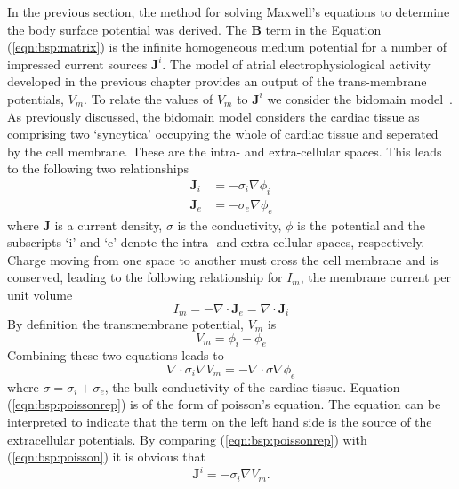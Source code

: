 In the previous section, the method for solving Maxwell's equations to determine
the body surface potential was derived.
The $\mathbf{B}$ term in the Equation (\ref{eqn:bsp:matrix}) is the infinite
homogeneous medium potential for a number of impressed current sources
$\mathbf{J}^i$.
The model of atrial electrophysiological activity developed in the previous
chapter provides an output of the trans-membrane potentials, $V_m$.
To relate the values of $V_m$ to $\mathbf{J}^i$ we consider the bidomain
model~\cite{Tung1978,Geselowitz1989}.
As previously discussed, the bidomain model considers the cardiac tissue as
comprising two `syncytica' occupying the whole of cardiac tissue and seperated
by the cell membrane.
These are the intra- and extra-cellular spaces.
This leads to the following two relationships
\begin{align}
\label{eqn:bsp:bidomaini}
\mathbf{J}_i & = -\sigma_i \nabla \phi_i \\
\label{eqn:bsp:bidomaine}
\mathbf{J}_e & = -\sigma_e \nabla \phi_e
\end{align}
where $\mathbf{J}$ is a current density, $\sigma$ is the conductivity, $\phi$
is the potential and the subscripts `i' and `e' denote the intra- and
extra-cellular spaces, respectively.
Charge moving from one space to another must cross the cell membrane and is
conserved, leading to the following relationship for $I_m$, the membrane current per unit
volume
\begin{equation}
\label{eqn:bsp:im}
I_m = -\nabla\cdot\mathbf{J}_e = \nabla\cdot\mathbf{J}_i
\end{equation}
By definition the transmembrane potential, $V_m$ is
\begin{equation}
\label{eqn:bsp:tmp}
V_m = \phi_i - \phi_e
\end{equation}
Combining these two equations leads to
\begin{equation}
\label{eqn:bsp:poissonrep}
\nabla\cdot\sigma_i\nabla V_m = -\nabla\cdot\sigma\nabla\phi_e
\end{equation}
where $\sigma = \sigma_i + \sigma_e$, the bulk conductivity of the cardiac
tissue.
Equation (\ref{eqn:bsp:poissonrep}) is of the form of poisson's equation.
The equation can be interpreted to indicate that the term on the left hand side
is the source of the extracellular potentials.
By comparing (\ref{eqn:bsp:poissonrep}) with (\ref{eqn:bsp:poisson}) it is
obvious that
\begin{equation}
\label{eqn:bsp:ji}
\mathbf{J}^i = -\sigma_i\nabla V_m.
\end{equation}

